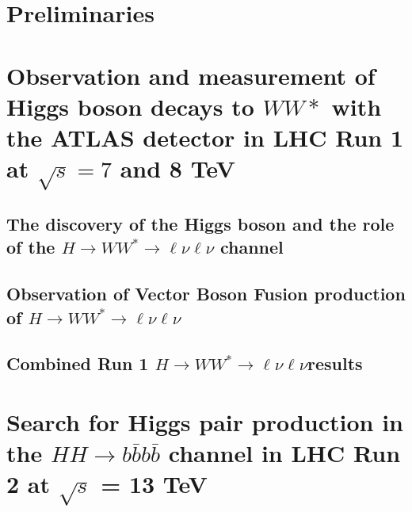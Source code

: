 \documentclass{Dissertate}
\begin{document}


\maketitle
\copyrightpage

\abstractpage
\tableofcontents
\listoffigures
\listoftables
\dedicationpage
\acknowledgments

\doublespacing

\newcommand\HWWfull          {$H\rightarrow WW^{*}\rightarrow \ell\nu\ell\nu$ }


\setcounter{chapter}{-1}  %

\part{Preliminaries}


\part{Observation and measurement of Higgs boson decays to $WW*$ with
  the ATLAS detector in LHC Run 1 at $\sqrt{s} = 7$ and 8 TeV}



\chapter{The discovery of the Higgs boson and the role of the $H\rightarrow WW^{*}\rightarrow \ell\nu\ell\nu$ channel}

\chapter{Observation of Vector Boson Fusion production of $H\rightarrow WW^{*}\rightarrow \ell\nu\ell\nu$}

\chapter{Combined Run 1 $H\rightarrow WW^{*}\rightarrow \ell\nu\ell\nu$results}

\part{Search for Higgs pair production in the $HH\rightarrow
  b\bar{b}b\bar{b}$ channel in LHC Run 2 at $\sqrt{s}$ = 13 TeV}
\end{document}
